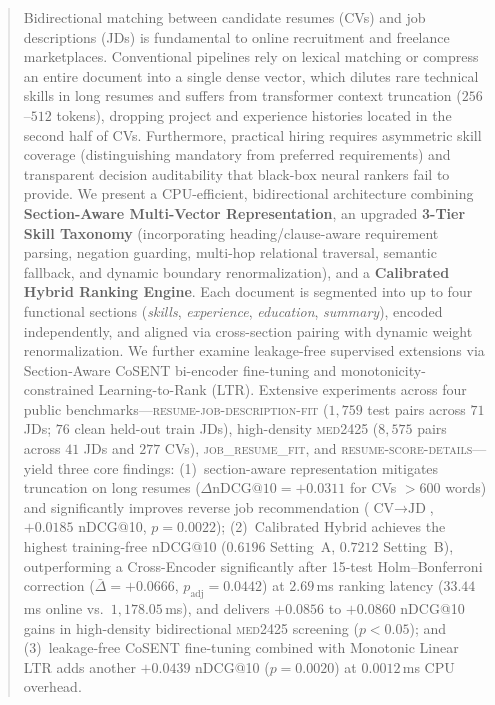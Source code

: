 \begin{abstract}
Bidirectional matching between candidate resumes (CVs) and job descriptions (JDs) is fundamental to online recruitment and freelance marketplaces. Conventional pipelines rely on lexical matching or compress an entire document into a single dense vector, which dilutes rare technical skills in long resumes and suffers from transformer context truncation ($256$--$512$ tokens), dropping project and experience histories located in the second half of CVs. Furthermore, practical hiring requires asymmetric skill coverage (distinguishing mandatory from preferred requirements) and transparent decision auditability that black-box neural rankers fail to provide. We present a CPU-efficient, bidirectional architecture combining \textbf{Section-Aware Multi-Vector Representation}, an upgraded \textbf{3-Tier Skill Taxonomy} (incorporating heading/clause-aware requirement parsing, negation guarding, multi-hop relational traversal, semantic fallback, and dynamic boundary renormalization), and a \textbf{Calibrated Hybrid Ranking Engine}. Each document is segmented into up to four functional sections (\textit{skills}, \textit{experience}, \textit{education}, \textit{summary}), encoded independently, and aligned via cross-section pairing with dynamic weight renormalization. We further examine leakage-free supervised extensions via Section-Aware CoSENT bi-encoder fine-tuning and monotonicity-constrained Learning-to-Rank (LTR). Extensive experiments across four public benchmarks---\textsc{resume-job-description-fit} ($1{,}759$ test pairs across $71$ JDs; $76$ clean held-out train JDs), high-density \textsc{med2425} ($8{,}575$ pairs across $41$ JDs and $277$ CVs), \textsc{job\_resume\_fit}, and \textsc{resume-score-details}---yield three core findings: (1)~section-aware representation mitigates truncation on long resumes ($\Delta\text{nDCG@10} = +0.0311$ for CVs $>600$ words) and significantly improves reverse job recommendation ($\text{CV} \rightarrow \text{JD}$, $+0.0185$ nDCG@10, $p = 0.0022$); (2)~Calibrated Hybrid achieves the highest training-free nDCG@10 ($0.6196$ Setting~A, $0.7212$ Setting~B), outperforming a Cross-Encoder significantly after 15-test Holm--Bonferroni correction ($\bar{\Delta} = +0.0666$, $p_{\text{adj}} = 0.0442$) at $2.69$\,ms ranking latency ($33.44$\,ms online vs.\ $1{,}178.05$\,ms), and delivers $+0.0856$ to $+0.0860$ nDCG@10 gains in high-density bidirectional \textsc{med2425} screening ($p < 0.05$); and (3)~leakage-free CoSENT fine-tuning combined with Monotonic Linear LTR adds another $+0.0439$ nDCG@10 ($p = 0.0020$) at $0.0012$\,ms CPU overhead.

\end{abstract}
